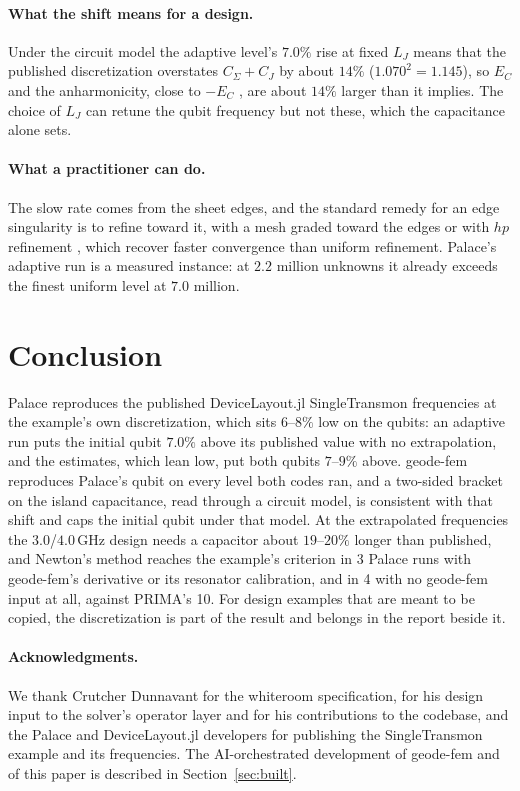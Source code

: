 \documentclass{anvil-paper}
\begin{document}
\paragraph{What the shift means for a design.}
Under the circuit model the adaptive level's $7.0\%$ rise at fixed $L_J$
means that the published discretization overstates $C_\Sigma + C_J$ by
about $14\%$ ($1.070^2 = 1.145$), so $E_C$ and the anharmonicity, close to
$-E_C$ \citep{koch2007charge}, are about $14\%$ larger than it implies.
The choice of $L_J$ can retune the qubit frequency but not these, which the
capacitance alone sets.

\paragraph{What a practitioner can do.}
The slow rate comes from the sheet edges, and the standard remedy for an
edge singularity is to refine toward it, with a mesh graded toward the
edges or with $hp$ refinement \citep{demkowicz2006computing}, which recover
faster convergence than uniform refinement. Palace's adaptive run is a
measured instance: at $2.2$ million unknowns it already exceeds the finest
uniform level at $7.0$ million.

\section{Conclusion}
\label{sec:conclusion}

Palace reproduces the published DeviceLayout.jl SingleTransmon
frequencies at the example's own discretization, which sits $6$--$8\%$ low on the qubits: an adaptive run puts the
initial qubit $7.0\%$ above its published value with no extrapolation, and
the estimates, which lean low, put both qubits $7$--$9\%$ above. geode-fem
reproduces Palace's qubit on every level both codes ran, and a two-sided
bracket on the island capacitance, read through a circuit model, is
consistent with that shift and caps the initial qubit under that model. At
the extrapolated frequencies the $3.0$/$4.0$\,GHz design needs a capacitor
about $19$--$20\%$ longer than published, and Newton's method reaches the
example's criterion in 3 Palace runs
with geode-fem's derivative or its resonator calibration, and in 4 with no
geode-fem input at all, against PRIMA's 10. For design
examples that are
meant to be copied, the discretization is part of the result and belongs
in the report beside it.

\paragraph{Acknowledgments.}
We thank Crutcher Dunnavant for the whiteroom specification, for his
design input to the solver's operator layer and for his contributions to
the codebase, and the Palace and DeviceLayout.jl developers for publishing
the SingleTransmon example and its frequencies. The AI-orchestrated
development of geode-fem and of this paper is described in
Section~\ref{sec:built}.



\end{document}
